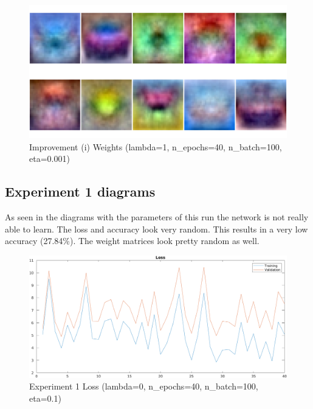     \begin{figure}[ht]
        \includegraphics[width=\textwidth]{../code/result_pics/lambda=1, n_epochs=40, n_batch=100, eta=.001 all data for training/weights.png}
        \caption{Improvement (i) Weights (lambda=1, n\_epochs=40, n\_batch=100, eta=0.001)}
        \label{fig:weightsa}
    \end{figure}

\clearpage

\subsection{Experiment 1 diagrams}
As seen in the diagrams with the parameters of this run the network is not really able to learn. The loss and accuracy look very random. 
This results in a very low accuracy (27.84\%). The weight matrices look pretty random as well.

    \begin{figure}[ht]
        \includegraphics[width=\textwidth]{../code/result_pics/lambda=0, n_epochs=40, n_batch=100, eta=.1/loss.png}
        \caption{Experiment 1 Loss (lambda=0, n\_epochs=40, n\_batch=100, eta=0.1)}
        \label{fig:loss1}
    \end{figure}

